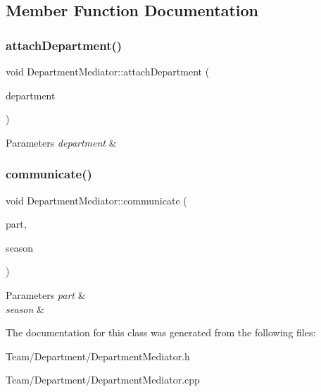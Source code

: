 \subsection{Member Function Documentation}
\mbox{\label{classDepartmentMediator_a24fa0b87c5dbcbf2868e062d599b49e3}} 
\subsubsection{\texorpdfstring{attach\+Department()}{attachDepartment()}}
{\footnotesize\ttfamily void Department\+Mediator\+::attach\+Department (\begin{DoxyParamCaption}\item[{\hyperlink{classDepartmentFactory}{Department\+Factory} $\ast$}]{department }\end{DoxyParamCaption})}


\begin{DoxyParams}{Parameters}
{\em department} & \\
\hline
\end{DoxyParams}
\mbox{\label{classDepartmentMediator_a1cd1ac08b0aa2d6eb7f31b9fb20155d6}} 
\subsubsection{\texorpdfstring{communicate()}{communicate()}}
{\footnotesize\ttfamily void Department\+Mediator\+::communicate (\begin{DoxyParamCaption}\item[{\hyperlink{classDepartmentOutput}{Department\+Output} $\ast$}]{part,  }\item[{string}]{season }\end{DoxyParamCaption})}


\begin{DoxyParams}{Parameters}
{\em part} & \\
\hline
{\em season} & \\
\hline
\end{DoxyParams}


The documentation for this class was generated from the following files\+:\begin{DoxyCompactItemize}
\item 
Team/\+Department/Department\+Mediator.\+h\item 
Team/\+Department/Department\+Mediator.\+cpp\end{DoxyCompactItemize}
